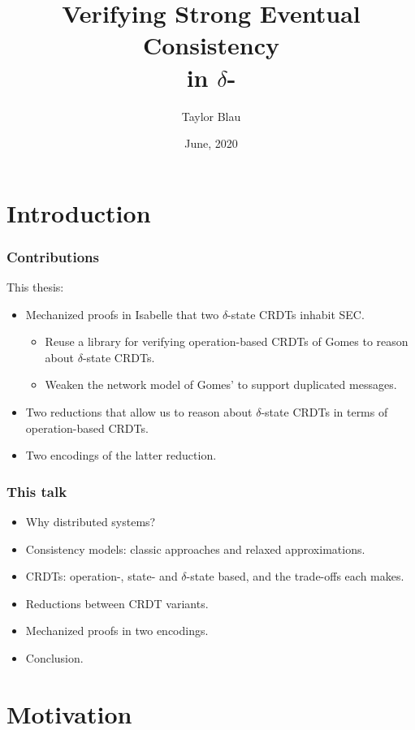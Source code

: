 \documentclass[aspectratio=169,compress,handout]{beamer}
\title{Verifying Strong Eventual Consistency\\ in $\delta$-\CRDTs}
\author{Taylor Blau}
\institute{University of Washington}
\date{June, 2020}
\newcommand*{\CRDT}{\textsf{CRDT}\xspace}
\newcommand*{\CRDTs}{\textsf{CRDTs}\xspace}
\newcommand*{\SEC}{\textsf{SEC}\xspace}
\begin{document}
  \frame{\titlepage}

  \section{Introduction}

  \begin{frame}
    \frametitle{Contributions}

    This thesis:
    \begin{itemize}[<+->]
      \item Mechanized proofs in Isabelle that two $\delta$-state \CRDTs inhabit
        \SEC.
        \begin{itemize}
          \item Reuse a library for verifying operation-based \CRDTs of Gomes to
            reason about $\delta$-state \CRDTs.
          \item Weaken the network model of Gomes' to support duplicated
            messages.
        \end{itemize}
      \item Two reductions that allow us to reason about $\delta$-state \CRDTs
        in terms of operation-based \CRDTs.
      \item Two encodings of the latter reduction.
    \end{itemize}
  \end{frame}

  \begin{frame}
    \frametitle{This talk}

    \begin{itemize}[<+->]
      \item Why distributed systems?
      \item Consistency models: classic approaches and relaxed approximations.
      \item \CRDTs: operation-, state- and $\delta$-state based, and the
        trade-offs each makes.
      \item Reductions between \CRDT variants.
      \item Mechanized proofs in two encodings.
      \item Conclusion.
    \end{itemize}
  \end{frame}

  \section{Motivation}
\end{document}
